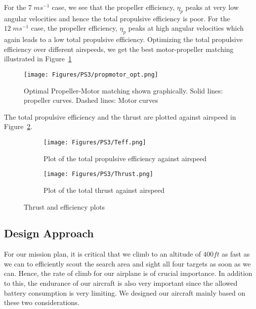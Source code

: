 \documentclass[11pt]{article}
\begin{document}
For the $7 \; ms^{-1}$ case, we see that the propeller efficiency, $\eta_p$ peaks at very low angular velocities and hence the total propulsive efficiency is poor. For the $12 \; ms^{-1}$ case, the propeller efficiency, $\eta_p$ peaks at high angular velocities which again leads to a low total propulsive efficiency. Optimizing the total propulsive efficiency over different airspeeds, we get the best motor-propeller matching illustrated in Figure~\ref{fig:prop-motor2}

\begin{figure}[h!]
  \centering
  \texttt{[image: Figures/PS3/propmotor\_opt.png]}
  \caption{Optimal Propeller-Motor matching shown graphically. Solid lines: propeller curves. Dashed lines: Motor curves}\label{fig:prop-motor2}
\end{figure}

The total propulsive efficiency and the thrust are plotted against airspeed in Figure~\ref{fig:teff-thrust}.

\begin{figure}[h!]
  \centering
    \begin{subfigure}[b]{0.49\textwidth}
                \texttt{[image: Figures/PS3/Teff.png]}
                \caption{Plot of the total propulsive efficiency against airspeed}
        \end{subfigure}
        \begin{subfigure}[b]{0.49\textwidth}
                \texttt{[image: Figures/PS3/Thrust.png]}
                \caption{Plot of the total thrust against airspeed}
        \end{subfigure}%
  \caption{Thrust and efficiency plots}\label{fig:teff-thrust}
\end{figure}

\subsection{Design Approach}
\label{DsignAppr}

For our mission plan, it is critical that we climb to an altitude of $400 ft$ as fast as we can to efficiently scout the search area and sight all four targets as soon as we can. Hence, the rate of climb for our airplane is of crucial importance. In addition to this, the endurance of our aircraft is also very important since the allowed battery consumption is very limiting. We designed our aircraft mainly based on these two considerations.
\end{document}

